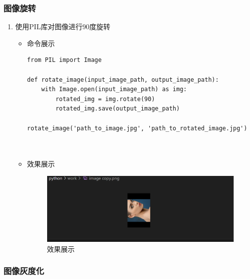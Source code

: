 \documentclass[UTF8]{ctexart}
\begin{document}
\subsubsection{图像旋转}

\begin{enumerate}
  \item 使用PIL库对图像进行90度旋转
  \begin{itemize}
  \item 命令展示
  \begin{verbatim}
from PIL import Image

def rotate_image(input_image_path, output_image_path):
    with Image.open(input_image_path) as img:
        rotated_img = img.rotate(90)
        rotated_img.save(output_image_path)

rotate_image('path_to_image.jpg', 'path_to_rotated_image.jpg')

    
  \end{verbatim}
\item 效果展示
  \begin{figure}[H]
    \centering
    \includegraphics[width=\textwidth]{333} %
    \caption{效果展示}
  \end{figure}
  \end{itemize}
\end{enumerate}
























\subsubsection{图像灰度化}
\end{document}

